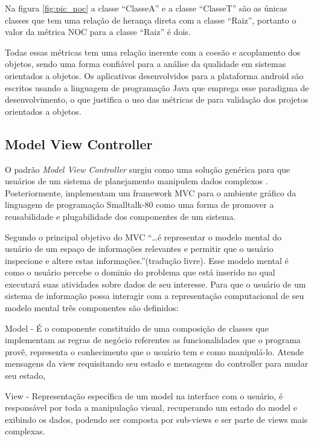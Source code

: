 \documentclass[conference]{IEEEtran}
\begin{document}
Na figura \ref{fig:pic_noc} a classe ``ClasseA'' e a classe ``ClasseT'' são as
únicas classes que tem uma relação de herança direta com a classe ``Raiz'',
portanto o valor da métrica NOC para a classe ``Raiz'' é  dois.


Todas essas métricas tem uma relação inerente com a coesão e acoplamento dos
objetos, sendo uma forma confiável para a análise da qualidade em sistemas
orientados a objetos. Os aplicativos desenvolvidos para a plataforma android são
escritos usando a linguagem de programação Java que emprega esse paradigma de
desenvolvimento, o que justifica o uso das métricas de \cite{cksuite} para
validação dos projetos orientados a objetos.

\subsection{Model View Controller}

O padrão \textit{Model View Controller} surgiu como uma solução genérica para
que usuários de um sistema de planejamento manipulem dados complexos
\cite{Reenskaug:1979}. Posteriormente, \cite{krasnerPope1988}
implementam um framework MVC para o ambiente gráfico da linguagem de programação
Smalltalk-80 como uma forma de promover a reusabilidade e plugabilidade dos
componentes de um sistema.

Segundo \cite{Reenskaug:1979} o principal objetivo do MVC
``\ldots é representar o modelo mental do usuário de um espaço de informações
relevantes e permitir que o usuário inspecione e altere estas
informações.''(tradução livre).
Esse modelo mental é como o usuário percebe o dominio do problema que está inserido no qual executará suas atividades sobre dados de seu interesse. Para que o usuário de um sistema de
informação possa interagir com a representação computacional  de seu modelo
mental três componentes são definidos:

Model - É o componente constituído de uma composição de classes que implementam
as regras de negócio referentes as funcionalidades que o programa provê,
representa o  conhecimento que o usuário tem e como manipulá-lo. Atende
mensagens da view requisitando seu estado e mensagens do controller para mudar
seu estado,

View - Representação específica de um model na interface com o usuário, é 
responsável por toda a manipulação visual, recuperando um estado do model e
exibindo os dados, podendo ser composta por sub-views e ser parte de views mais
complexas.
\end{document}
